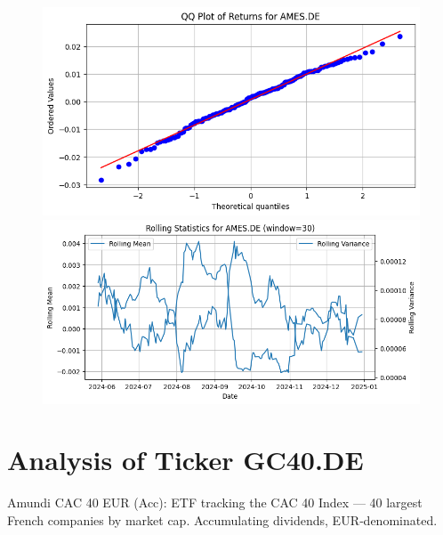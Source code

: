 \documentclass{article}%
\begin{document}
%


\begin{figure}[htbp]%
\begin{minipage}{0.31\textwidth}%
\includegraphics[width=\linewidth]{ticker_images/AMES.DE_qq_plot.png}%
\end{minipage}%
\begin{minipage}{0.31\textwidth}%
\includegraphics[width=\linewidth]{ticker_images/AMES.DE_rolling_stats.png}%
\end{minipage}%
\end{figure}

%
\section*{Analysis of Ticker GC40.DE}%
\label{sec:AnalysisofTickerGC40.DE}%
Amundi CAC 40 EUR (Acc): ETF tracking the CAC 40 Index — 40 largest French companies by market cap. Accumulating dividends, EUR‑denominated.%
\end{document}
